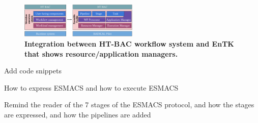 \begin{figure}[tb]
\centering
  \includegraphics[width=0.5\textwidth]{FIGURES/entk_htbac_integration.pdf}
  \caption{\bf Integration between HT-BAC workflow system and EnTK that shows resource/application managers.}
   \label{figure:ht-bac_entk}
\end{figure}

Add code snippets 

How to express ESMACS and how to execute ESMACS


Remind the reader of the 7 stages of the ESMACS protocol, and how the stages are expressed, and how the pipelines are added 


